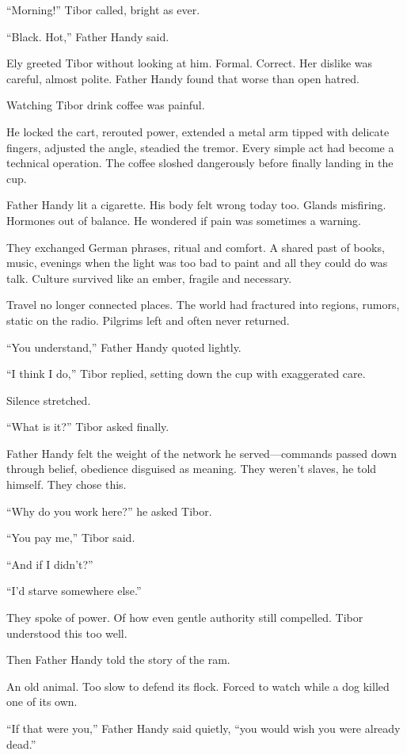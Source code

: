 “Morning!” Tibor called, bright as ever.

“Black. Hot,” Father Handy said.

Ely greeted Tibor without looking at him. Formal. Correct. Her dislike was careful, almost polite. Father Handy found that worse than open hatred.

Watching Tibor drink coffee was painful.

He locked the cart, rerouted power, extended a metal arm tipped with delicate fingers, adjusted the angle, steadied the tremor. Every simple act had become a technical operation. The coffee sloshed dangerously before finally landing in the cup.

Father Handy lit a cigarette. His body felt wrong today too. Glands misfiring. Hormones out of balance. He wondered if pain was sometimes a warning.

They exchanged German phrases, ritual and comfort. A shared past of books, music, evenings when the light was too bad to paint and all they could do was talk. Culture survived like an ember, fragile and necessary.

Travel no longer connected places. The world had fractured into regions, rumors, static on the radio. Pilgrims left and often never returned.

“You understand,” Father Handy quoted lightly.

“I think I do,” Tibor replied, setting down the cup with exaggerated care.

Silence stretched.

“What is it?” Tibor asked finally.

Father Handy felt the weight of the network he served—commands passed down through belief, obedience disguised as meaning. They weren’t slaves, he told himself. They chose this.

“Why do you work here?” he asked Tibor.

“You pay me,” Tibor said.

“And if I didn’t?”

“I’d starve somewhere else.”

They spoke of power. Of how even gentle authority still compelled. Tibor understood this too well.

Then Father Handy told the story of the ram.

An old animal. Too slow to defend its flock. Forced to watch while a dog killed one of its own.

“If that were you,” Father Handy said quietly, “you would wish you were already dead.”

